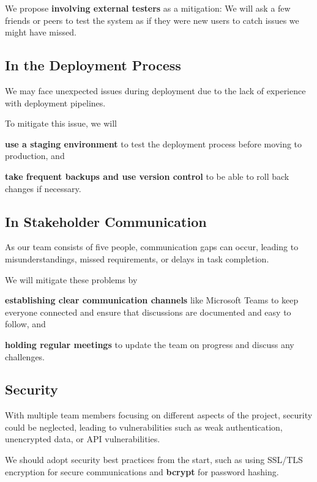 \documentclass[twoside,a4paper,journal]{IEEEtran}
\begin{document}
We propose \textbf{involving external testers} as a mitigation:
We will ask a few friends or peers to test the system as if they were new users
to catch issues we might have missed.

\subsection{In the Deployment Process}
We may face unexpected issues during deployment due to the lack of experience
with deployment pipelines.

To mitigate this issue, we will
\begin{enumerate*}
  \item \textbf{use a staging environment} to test the deployment process before
    moving to production, and
  \item \textbf{take frequent backups and use version control} to be able to
    roll back changes if necessary.
\end{enumerate*}

\subsection{In Stakeholder Communication}
As our team consists of five people, communication gaps can occur, leading to
misunderstandings, missed requirements, or delays in task completion.

We will mitigate these problems by
\begin{enumerate*}
  \item \textbf{establishing clear communication channels}
    like Microsoft Teams to keep everyone connected and ensure that discussions
    are documented and easy to follow, and
  \item \textbf{holding regular meetings}
    to update the team on progress and discuss any challenges.
\end{enumerate*}

\subsection{Security}
With multiple team members focusing on different aspects of the project,
security could be neglected, leading to vulnerabilities such as weak
authentication, unencrypted data, or API vulnerabilities.

We should adopt security best practices from the start, such as using SSL/TLS
encryption for secure communications and \textbf{bcrypt} for password hashing.
\end{document}
